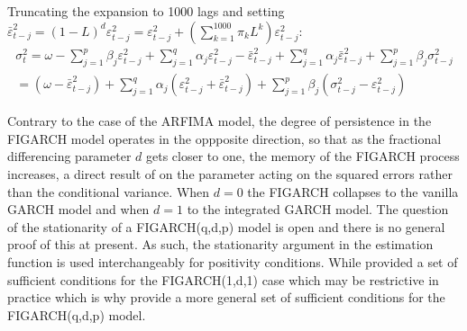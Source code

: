 Truncating the expansion to 1000 lags and setting $\bar \varepsilon _{t - j}^2 = {\left( {1 - L} \right)^d}\varepsilon _{t - j}^2 = \varepsilon _{t - j}^2 + \left( {\sum\limits_{k = 1}^{1000} {{\pi _k}{L^k}} } \right)\varepsilon _{t - j}^2$:
\begin{equation}
\begin{array}{l}
\sigma _t^2 = \omega  - \sum\limits_{j = 1}^p {{\beta _j}\varepsilon _{t - j}^2 + } \sum\limits_{j = 1}^q {{\alpha _j}\varepsilon _{t - j}^2 - \bar \varepsilon _{t - j}^2 + \sum\limits_{j = 1}^q {{\alpha _j}\bar \varepsilon _{t - j}^2 + } } \sum\limits_{j = 1}^p {{\beta _j}\sigma _{t - j}^2} \\
 = \left( {\omega  - \bar \varepsilon _{t - j}^2} \right) + \sum\limits_{j = 1}^q {{\alpha _j}\left( {\varepsilon _{t - j}^2 + \bar \varepsilon _{t - j}^2} \right)}  + \sum\limits_{j = 1}^p {{\beta _j}\left( {\sigma _{t - j}^2 - \varepsilon _{t - j}^2} \right)}
\end{array}
\end{equation}

Contrary to the case of the ARFIMA model, the degree of persistence in the FIGARCH model operates in the oppposite direction, so that as the fractional differencing parameter $d$ gets closer to one, the memory of the FIGARCH process increases, a direct result of on the parameter acting on the squared errors rather than the conditional variance. When $d=0$ the FIGARCH collapses to the vanilla GARCH model and when $d=1$ to the integrated GARCH model. The question of the stationarity of a FIGARCH(q,d,p) model is open and there is no general proof of this at present. As such, the stationarity argument in the estimation function is used interchangeably for positivity conditions. While \cite{Baillie1996} provided a set of sufficient conditions for the FIGARCH(1,d,1) case which may be restrictive in practice which is why \cite{Conrad2006} provide a more general set of sufficient conditions for the FIGARCH(q,d,p) model.

